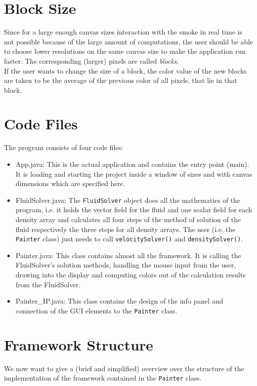\documentclass[a4paper,10pt,oneside,final,german,openbib,pdftex,titlepage]{scrbook}
\begin{document}
\section{Block Size}\label{sec:block-size}
Since for a large enough canvas sizes interaction with the smoke in real time is not possible because of the large amount of computations, the user should be able to choose lower resolutions on the same canvas size to make the application run faster. The corresponding (larger) pixels are called \emph{blocks}.\\

If the user wants to change the size of a block, the color value of the new blocks are taken to be the average of the previous color of all pixels, that lie in that block.
\section{Code Files}
The program consists of four code files:
\begin{itemize}
\item App.java: This is the actual application and contains the entry point (main). It is loading and starting the project inside a window of sizes and with canvas dimensions which are specified here.
\item FluidSolver.java: The \texttt{FluidSolver} object does all the mathematics of the program, i.e. it holds the vector field for the fluid and one scalar field for each density array and calculates all four steps of the method of solution of the fluid respectively the three steps for all density arrays. The user (i.e. the \texttt{Painter} class) just needs to call \texttt{velocitySolver()} and \texttt{densitySolver()}.
\item Painter.java: This class contains almost all the framework. It is calling the FluidSolver's solution methods, handling the mouse input from the user, drawing into the display and computing colors out of the calculation results from the FluidSolver.
\item Painter\_IP.java: This class contains the design of the info panel and connection of the GUI elements to the \texttt{Painter} class.
\end{itemize}
\section{Framework Structure}
We now want to give a (brief and simplified) overview over the structure of the implementation of the framework contained in the \texttt{Painter} class.\\
\end{document}

